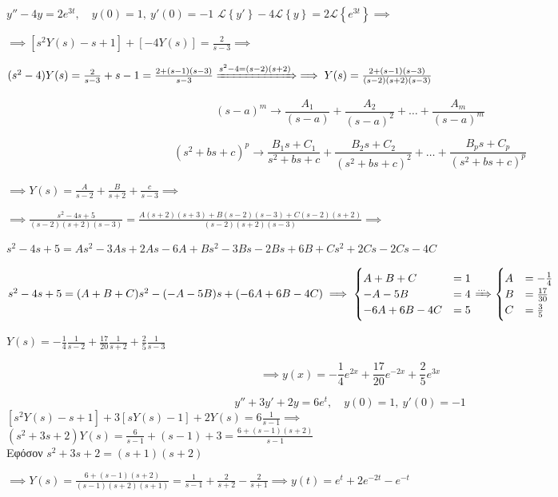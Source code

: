 \documentclass[11pt,a4paper,titlepage,draft]{article}
\begin{document}
\begin{exercise*}{12.5}
	\( y''-4y=2e^{3t},\quad y(0)=1,\ y'(0)=-1 \)
	\tcblower
	\( \mathscr L \left\lbrace y' \right\rbrace -4\mathscr L \left\lbrace y \right\rbrace = 2 \mathscr L\left\lbrace e^{3t} \right\rbrace \implies \)
	
	\( \implies \left[
	s^2Y(s)-s+1
	\right] + \left[-4Y(s)\right] = \frac{2}{s-3} \implies \)
	
	\( (s^2-4)Y(s) = \frac{2}{s-3}+s-1=\frac{2+(s-1)(s-3)}{s-3} \xRightarrow{s^2-4=(s-2)(s+2)} \implies Y(s) = \frac{2+(s-1)(s-3)}{(s-2)(s+2)(s-3)} \)
	
	\begin{attnbox}{}
		\[
		(s-a)^m \rightarrow \frac{A_1}{(s-a)}+\frac{A_2}{(s-a)^2}+\dots + \frac{A_m}{(s-a)^m}
		\]
		
		\[
		(s^2+bs+c)^p \rightarrow 
		\frac{B_1s+C_1}{s^2+bs+c} + \frac{B_2s+C_2}{(s^2+bs+c)^2} + \dots + \frac{B_ps+C_p}{(s^2+bs+c)^p}
		\]
	\end{attnbox}
	
	\( \implies Y(s) = \frac{A}{s-2}+\frac{B}{s+2} + \frac{c}{s-3} \implies  \)
	
	\( \implies \frac{s^2-4s+5}{(s-2)(s+2)(s-3)} = \frac{A(s+2)(s+3)+B(s-2)(s-3)+C(s-2)(s+2)}{(s-2)(s+2)(s-3)} \implies \)
	
	\( s^2-4s+5 = As^2-3As+2As-6A +Bs^2-3Bs-2Bs+6B+Cs^2+2Cs-2Cs-4C \)
	
	\( s^2-4s+5 = (A+B+C)s^2 - (-A-5B)s + (-6A+6B-4C) \implies \begin{cases}
	A+B+C &= 1 \\
	-A-5B &= 4 \\
	-6A +6B -4C &= 5
	\end{cases} \xRightarrow{\dots} \begin{cases}
	A &= -\frac{1}{4} \\
	B &= \frac{17}{30} \\
	C &= \frac{3}{5}
	\end{cases} \)
	
	\( Y(s) = -\frac{1}{4}\frac{1}{s-2} + \frac{17}{20} \frac{1}{s+2} + \frac{2}{5}\frac{1}{s-3} \) 
	
	\[ \implies \boxed{ y(x) = -\frac{1}{4}e^{2x}+\frac{17}{20}e^{-2x}+\frac{2}{5}e^{3x}} \]
\end{exercise*}

\begin{exercise*}{12.6}
	\[
	y''+3y'+2y=6e^t,\quad y(0) = 1,\ y'(0) = -1
	\]
	\tcblower
	\( \left[s^2Y(s)-s+1\right] +3\left[sY(s)-1\right]+2Y(s) = 6\frac{1}{s-1}
	\implies \) \\
	\( (s^2+3s+2)Y(s) = \frac{6}{s-1}+(s-1)+3 = \frac{6+(s-1)(s+2)}{s-1} \) \\
	Εφόσον \( s^2+3s+2=(s+1)(s+2) \)
	
	\( \implies Y(s) = \frac{6+(s-1)(s+2)}{(s-1)(s+2)(s+1)} 
	= \frac{1}{s-1}+\frac{2}{s+2}-\frac{2}{s+1}
	\implies \boxed{ y(t) = e^t+2e^{-2t}-e^{-t} }
	\)
\end{exercise*}
\end{document}

